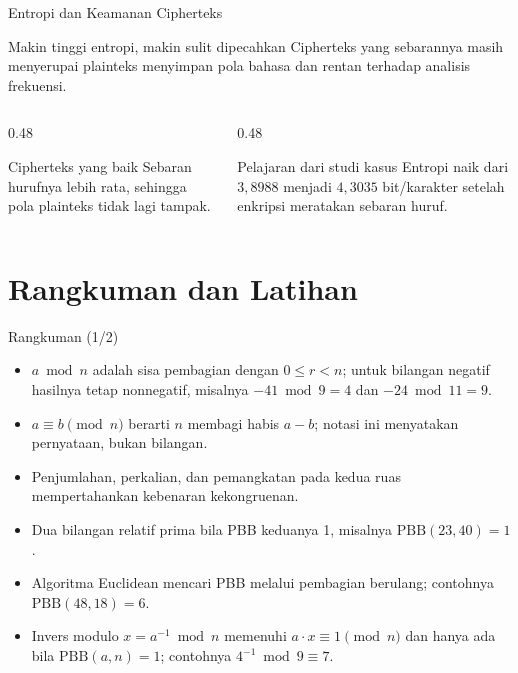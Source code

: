 \documentclass[aspectratio=169,11pt]{beamer}
\begin{document}
\begin{frame}{Entropi dan Keamanan Cipherteks}
    \begin{block}{Makin tinggi entropi, makin sulit dipecahkan}
        Cipherteks yang sebarannya masih menyerupai plainteks menyimpan pola
        bahasa dan rentan terhadap analisis frekuensi.
    \end{block}
    \vspace{0.2cm}
    \begin{columns}[T,onlytextwidth]
        \begin{column}{0.48\textwidth}
            \begin{exampleblock}{Cipherteks yang baik}
                Sebaran hurufnya lebih rata, sehingga pola plainteks tidak
                lagi tampak.
            \end{exampleblock}
        \end{column}
        \begin{column}{0.48\textwidth}
            \begin{alertblock}{Pelajaran dari studi kasus}
                Entropi naik dari $3{,}8988$ menjadi $4{,}3035$
                bit/karakter setelah enkripsi meratakan sebaran huruf.
            \end{alertblock}
        \end{column}
    \end{columns}
\end{frame}

\section{Rangkuman dan Latihan}

\begin{frame}{Rangkuman (1/2)}
    \footnotesize
    \begin{itemize}
        \item $a \bmod n$ adalah sisa pembagian dengan $0 \le r < n$;
              untuk bilangan negatif hasilnya tetap nonnegatif, misalnya
              $-41 \bmod 9 = 4$ dan $-24 \bmod 11 = 9$.
        \item $a \equiv b \pmod n$ berarti $n$ membagi habis $a - b$;
              notasi ini menyatakan pernyataan, bukan bilangan.
        \item Penjumlahan, perkalian, dan pemangkatan pada kedua ruas
              mempertahankan kebenaran kekongruenan.
        \item Dua bilangan relatif prima bila PBB keduanya 1, misalnya
              $\text{PBB}(23,40) = 1$.
        \item Algoritma Euclidean mencari PBB melalui pembagian berulang;
              contohnya $\text{PBB}(48,18) = 6$.
        \item Invers modulo $x = a^{-1} \bmod n$ memenuhi
              $a \cdot x \equiv 1 \pmod n$ dan hanya ada bila
              $\text{PBB}(a,n) = 1$; contohnya $4^{-1} \bmod 9 \equiv 7$.
    \end{itemize}
\end{frame}
\end{document}
